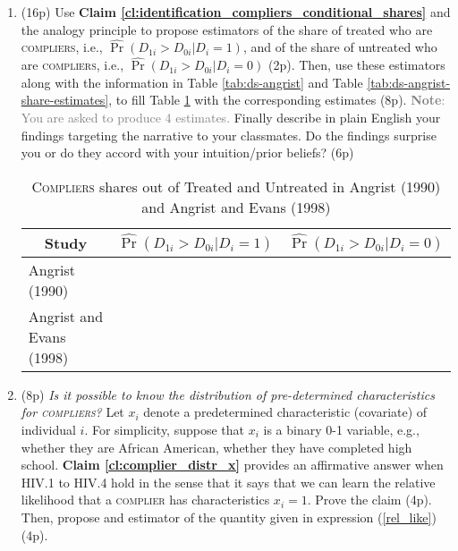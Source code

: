 \documentclass{article}
\begin{document}
\begin{enumerate}[label=\textbf{Q\arabic{enumi}}.,ref=Q\arabic{enumi}, wide=0pt, itemsep=0em, topsep=5pt, labelindent=0pt, resume]
\item (16p) Use \textbf{Claim \ref{cl:identification_compliers_conditional_shares}} and the analogy principle to propose estimators of the share of treated who are \textsc{compliers}, i.e., $\widehat{\Pr }\left(D_{1i}>D_{0i}|D_{i}=1\right)$, and of the share of untreated who are \textsc{compliers}, i.e., $\widehat{\Pr }\left(D_{1i}>D_{0i}|D_{i}=0\right)$ (2p). Then, use these estimators along with the information in Table \ref{tab:ds-angrist} and Table \ref{tab:ds-angrist-share-estimates}, to fill Table \ref{tab:ds-angrist-2} with the corresponding estimates (8p). \textcolor{gray}{\textbf{Note}: You are asked to produce 4 estimates.} Finally describe in plain English your findings targeting the narrative to your classmates. Do the findings surprise you or do they accord with your intuition/prior beliefs? (6p) 

\begin{table}[H]
\centering
{\renewcommand{\arraystretch}{1.5}
\begin{tabular}{ccc}
\hline\hline
\textbf{Study} &  $\widehat{\Pr }\left(D_{1i}>D_{0i}|D_{i}=1\right) $ & $\widehat{\Pr }\left(D_{1i}>D_{0i}|D_{i}=0\right) $ \\ \hline
\multicolumn{1}{l}{Angrist (1990)} & \multicolumn{1}{l}{} &    \\ 
\multicolumn{1}{l}{Angrist and Evans (1998)} & \multicolumn{1}{l}{} &    \\ 
\hline\hline
\end{tabular}}
\caption{\textsc{Compliers} shares out of Treated and Untreated in Angrist (1990) and Angrist and Evans (1998)}
\label{tab:ds-angrist-2}
\end{table}


\item (8p) \textit{Is it possible to know the distribution of pre-determined characteristics for \textsc{compliers}?} Let $x_{i}$ denote a predetermined characteristic (covariate) of individual $i$. For simplicity, suppose that $x_{i}$ is a binary 0-1 variable, e.g., whether they are African American, whether they have completed high school. \textbf{Claim \ref{cl:complier_distr_x}} provides an affirmative answer when HIV.1 to HIV.4 hold in the sense that it says that we can learn the relative likelihood that a \textsc{complier} has characteristics $x_i=1$. Prove the claim (4p). Then, propose and estimator of the quantity given in expression (\ref{rel_like}) (4p).


\end{enumerate}
\end{document}
